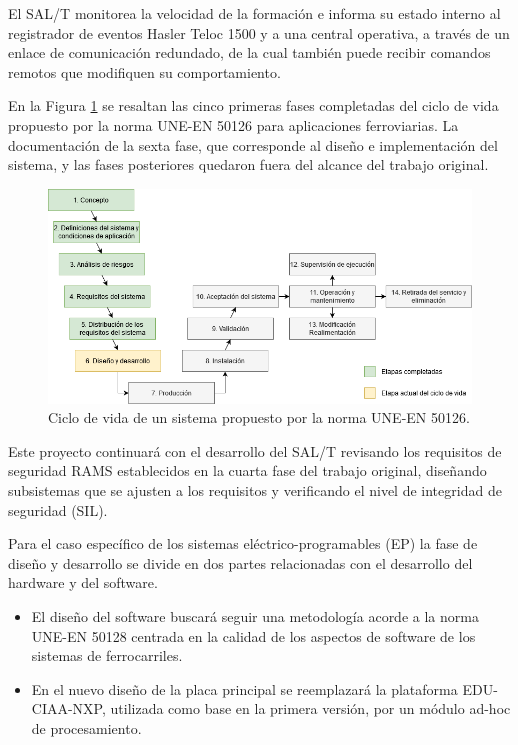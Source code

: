 \documentclass[11pt]{charter}
\begin{document}
El SAL/T monitorea la velocidad de la formación e informa su estado interno al registrador de eventos Hasler Teloc 1500 
y a una central operativa, a través de un enlace de comunicación redundado, de la cual también puede recibir comandos 
remotos que modifiquen su comportamiento.

En la Figura \ref{fig:ciclo_de_vida_50126} se resaltan las cinco primeras fases completadas del ciclo de vida propuesto 
por la norma UNE-EN 50126 para aplicaciones ferroviarias. La documentación de la sexta fase, que corresponde al diseño 
e implementación del sistema, y las fases posteriores quedaron fuera del alcance del trabajo original.

\vspace{10px}

\begin{figure}[htpb]
\centering 
\includegraphics[width=1\textwidth]{./Figuras/ciclo_de_vida_50126.png}
\caption{Ciclo de vida de un sistema propuesto por la norma UNE-EN 50126.}
\label{fig:ciclo_de_vida_50126}
\end{figure}

\vspace{10px}

Este proyecto continuará con el desarrollo del SAL/T revisando los requisitos de seguridad RAMS establecidos en la cuarta fase 
del trabajo original, diseñando subsistemas que se ajusten a los requisitos y verificando el nivel de integridad 
de seguridad (SIL).

Para el caso específico de los sistemas eléctrico-programables (EP) la fase de diseño y desarrollo se divide en dos 
partes relacionadas con el desarrollo del hardware y del software.

\begin{itemize}
\item El diseño del software buscará seguir una metodología acorde a la norma UNE-EN 50128 centrada en la calidad de los 
aspectos de software de los sistemas de ferrocarriles.
\item En el nuevo diseño de la placa principal se reemplazará la plataforma EDU-CIAA-NXP, utilizada como base en la primera 
versión, por un módulo ad-hoc de procesamiento.
\end{itemize}
\end{document}
